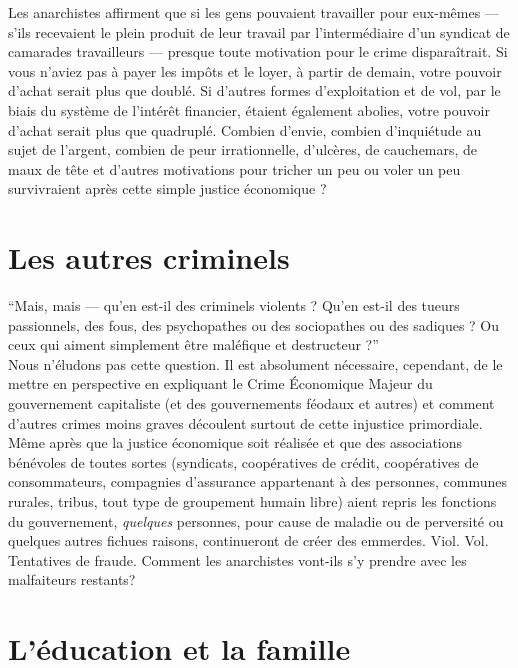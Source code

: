 Les anarchistes affirment que si les gens pouvaient travailler pour eux-mêmes --- s'ils recevaient le plein produit de leur travail par l'intermédiaire d'un syndicat de camarades travailleurs --- presque toute motivation pour le crime disparaîtrait. Si vous n'aviez pas à payer les impôts et le loyer, à partir de demain, votre pouvoir d'achat serait plus que doublé. Si d'autres formes d'exploitation et de vol, par le biais du système de l'intérêt financier, étaient également abolies, votre pouvoir d'achat serait plus que quadruplé. Combien d'envie, combien d'inquiétude au sujet de l'argent, combien de peur irrationnelle, d'ulcères, de cauchemars, de maux de tête et d'autres motivations pour tricher un peu ou voler un peu survivraient après cette simple justice économique ?

\section*{Les autres criminels}

``Mais, mais --- qu'en est-il des criminels violents ? Qu'en est-il des tueurs passionnels, des fous, des psychopathes ou des sociopathes ou des sadiques ? Ou ceux qui aiment simplement être maléfique et destructeur ?''\\
Nous n'éludons pas cette question. Il est absolument nécessaire, cependant, de le mettre en perspective en expliquant le Crime Économique Majeur du gouvernement capitaliste (et des gouvernements féodaux et autres) et comment d'autres crimes moins graves découlent surtout de cette injustice primordiale.\\
Même après que la justice économique soit réalisée et que des associations bénévoles de toutes sortes (syndicats, coopératives de crédit, coopératives de consommateurs, compagnies d'assurance appartenant à des personnes, communes rurales, tribus, tout type de groupement humain libre) aient repris les fonctions du gouvernement, \emph{quelques} personnes, pour cause de maladie ou de perversité ou quelques autres fichues raisons, continueront de créer des emmerdes. Viol. Vol. Tentatives de fraude. Comment les anarchistes vont-ils s'y prendre avec les malfaiteurs restants?

\section*{L'éducation et la famille}

